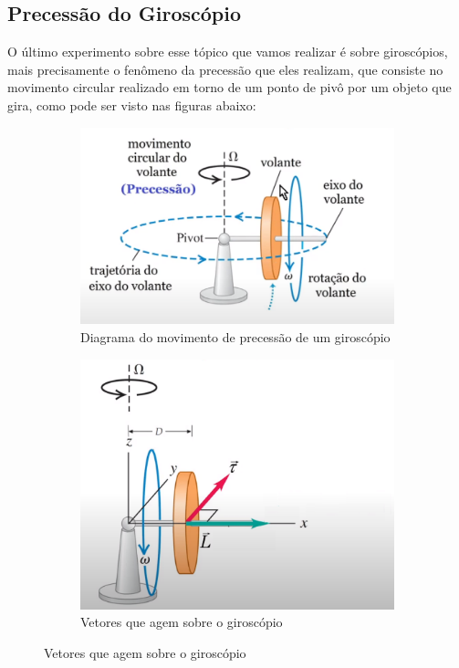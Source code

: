 \subsection{Precessão do Giroscópio}

O último experimento sobre esse tópico que vamos realizar é sobre giroscópios, mais precisamente o fenômeno da precessão que eles realizam, que consiste no movimento circular realizado em torno de um ponto de pivô por um objeto que gira, como pode ser visto nas figuras abaixo:

\begin{figure}[H]
  \centering
    \begin{subfigure}[b]{0.48\textwidth}
        \centering
        \includegraphics[width=\textwidth]{images/movimento-giroscopio.png}
        \caption{Diagrama do movimento de precessão de um giroscópio}
    \end{subfigure}
    \hfill
    \begin{subfigure}[b]{0.48\textwidth}
        \centering
        \includegraphics[width=\textwidth]{images/propriedades-giroscopio.png}
        \caption{Vetores que agem sobre o giroscópio}
    \end{subfigure}
\end{figure}

